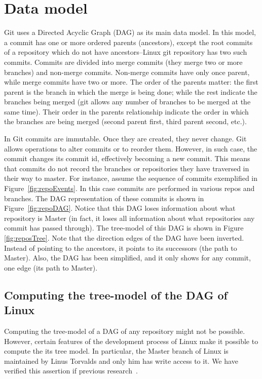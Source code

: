 \documentclass[conference, draftclsnofoot, draft]{IEEEtran}
\begin{document}
\section{Data model}

Git uses a Directed Acyclic Graph (DAG) as its main data model. In this model, a commit has one or more ordered parents (ancestors), except the root commits of a repository which
do not have ancestors--Linux git repository has two such commits. Commits are divided into merge commits (they merge two or more branches) and non-merge
commits. Non-merge commits have only once parent, while merge commits have two or more. The order of the parents matter: the first parent is the branch in which
the merge is being done; while the rest indicate the branches being merged (git allows any number of branches to be merged at the same time). Their order in the
parents relationship indicate the order in which the branches are being merged (second parent first, third parent second, etc.).

In Git commits are immutable. Once they are created, they never change. Git allows operations to alter commits or to reorder them. However, in such case, the
commit changes its commit id, effectively becoming a new commit. This means that commits do not record the branches or repositories they have traversed in their
way to master. 
For instance, assume the sequence of commits  exemplified in Figure~\ref{fig:repoEvents}. In this case commits are performed in various repos and branches. The
DAG representation of these commits is shown in Figure~\ref{fig:repoDAG}. Notice that this DAG loses information about what repository is Master (in fact, it
loses all information about what repositories any commit has passed through). The tree-model of this DAG is shown in Figure~
\ref{fig:reposTree}. Note that the direction edges of the DAG have been inverted. Instead of pointing to the ancestors, it points to its successors (the path to
Master). Also, the DAG has been simplified, and it only shows for any commit, one edge (its path to Master).

\subsection{Computing the tree-model of the DAG of Linux}

Computing the tree-model of a DAG of any repository might not be possible. However, certain features of the development process of Linux make it possible to
compute the its tree model. In particular, the Master branch of Linux is maintained by Linus Torvalds and only him has write access to it. We have verified this
assertion if previous research~\cite{German2015}.
\end{document}
